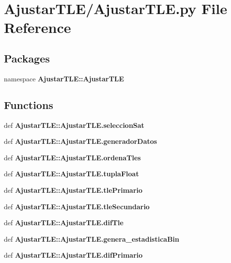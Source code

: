 \section{\-Ajustar\-T\-L\-E/\-Ajustar\-T\-L\-E.py \-File \-Reference}
\label{_ajustar_t_l_e_8py}
\subsection*{\-Packages}
\begin{DoxyCompactItemize}
\item 
namespace {\bf \-Ajustar\-T\-L\-E\-::\-Ajustar\-T\-L\-E}
\end{DoxyCompactItemize}
\subsection*{\-Functions}
\begin{DoxyCompactItemize}
\item 
def {\bf \-Ajustar\-T\-L\-E\-::\-Ajustar\-T\-L\-E.\-seleccion\-Sat}
\item 
def {\bf \-Ajustar\-T\-L\-E\-::\-Ajustar\-T\-L\-E.\-generador\-Datos}
\item 
def {\bf \-Ajustar\-T\-L\-E\-::\-Ajustar\-T\-L\-E.\-ordena\-Tles}
\item 
def {\bf \-Ajustar\-T\-L\-E\-::\-Ajustar\-T\-L\-E.\-tupla\-Float}
\item 
def {\bf \-Ajustar\-T\-L\-E\-::\-Ajustar\-T\-L\-E.\-tle\-Primario}
\item 
def {\bf \-Ajustar\-T\-L\-E\-::\-Ajustar\-T\-L\-E.\-tle\-Secundario}
\item 
def {\bf \-Ajustar\-T\-L\-E\-::\-Ajustar\-T\-L\-E.\-dif\-Tle}
\item 
def {\bf \-Ajustar\-T\-L\-E\-::\-Ajustar\-T\-L\-E.\-genera\-\_\-estadistica\-Bin}
\item 
def {\bf \-Ajustar\-T\-L\-E\-::\-Ajustar\-T\-L\-E.\-dif\-Primario}
\end{DoxyCompactItemize}
